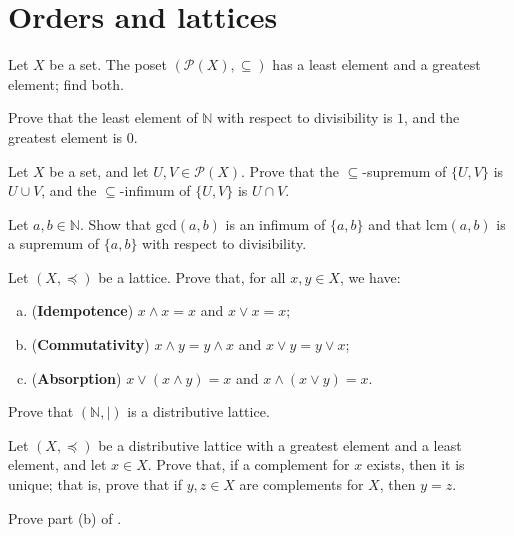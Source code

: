 \section{Orders and lattices}
\label{secOrderRelations}
\label{secPosets}
\label{secOrdersLattices}


\begin{exercise}
Let $X$ be a set. The poset $(\mathcal{P}(X), \subseteq)$ has a least element and a greatest element; find both.
\end{exercise}

\begin{exercise}
Prove that the least element of $\mathbb{N}$ with respect to divisibility is $1$, and the greatest element is $0$.
\end{exercise}


\begin{exercise}
Let $X$ be a set, and let $U,V \in \mathcal{P}(X)$. Prove that the $\subseteq$-supremum of $\{ U, V \}$ is $U \cup V$, and the $\subseteq$-infimum of $\{ U, V \}$ is $U \cap V$.
\end{exercise}

\begin{exercise}
Let $a,b \in \mathbb{N}$. Show that $\mathrm{gcd}(a,b)$ is an infimum of $\{ a, b \}$ and that $\mathrm{lcm}(a,b)$ is a supremum of $\{ a, b \}$ with respect to divisibility.
\end{exercise}

\begin{exercise}
Let $(X, \preceq)$ be a lattice. Prove that, for all $x,y \in X$, we have:
\begin{enumerate}[(a)]
\item (\textbf{Idempotence}) $x \wedge x = x$ and $x \vee x = x$;
\item (\textbf{Commutativity}) $x \wedge y = y \wedge x$ and $x \vee y = y \vee x$;
\item (\textbf{Absorption}) $x \vee (x \wedge y) = x$ and $x \wedge (x \vee y) = x$.
\end{enumerate}
\end{exercise}


\begin{exercise}
\label{exNIsDistributiveLatticeUnderDivisibility}
Prove that $(\mathbb{N}, {\mid})$ is a distributive lattice.
\end{exercise}

\begin{exercise}
Let $(X, \preceq)$ be a distributive lattice with a greatest element and a least element, and let $x \in X$. Prove that, if a complement for $x$ exists, then it is unique; that is, prove that if $y,z \in X$ are complements for $X$, then $y=z$.
\end{exercise}

\begin{exercise}
Prove part (b) of .
\end{exercise}